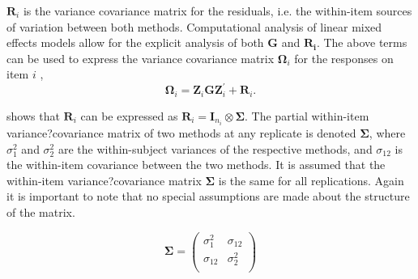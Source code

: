 \documentclass[12pt, a4paper]{article}
\theoremstyle{plain}
\theoremstyle{definition}
\theoremstyle{remark}
\begin{document}
	$\boldsymbol{R}_{i}$ is the variance covariance matrix for the residuals, i.e. the within-item sources of variation between both methods. Computational analysis of linear mixed effects models allow for the explicit analysis of both $\boldsymbol{G}$ and $\boldsymbol{R_i}$.
		The above terms can be used to express the  variance covariance matrix $\boldsymbol{\Omega}_i$ for the responses on item $i$ ,
		\[
		\boldsymbol{\Omega}_i = \boldsymbol{Z}_i \boldsymbol{G} \boldsymbol{Z}_i^{\prime} + \boldsymbol{R}_i.
		\]
		
	\citet{hamlett} shows that $\boldsymbol{R}_{i}$  can be expressed as $\boldsymbol{R}_{i} = \boldsymbol{I}_{n_{i}} \otimes \boldsymbol{\Sigma}$. The partial within-item variance?covariance matrix of two methods at any replicate is denoted $\boldsymbol{\Sigma}$, where $\sigma^2_{1}$ and $\sigma^2_{2}$ are the within-subject variances of the respective methods, and $\sigma_{12}$ is the within-item covariance between the two methods. It is assumed that the within-item variance?covariance matrix $\boldsymbol{\Sigma}$ is the same for all replications. Again it is important to note that no special assumptions are made about the structure of the matrix.
	
	\begin{equation}
	\boldsymbol{\Sigma} = \left( \begin{array}{cc}
	\sigma^2_{1} & \sigma_{12} \\
	\sigma_{12} & \sigma^2_{2} \\
	\end{array}\right)
	\end{equation}
	
\end{document}
